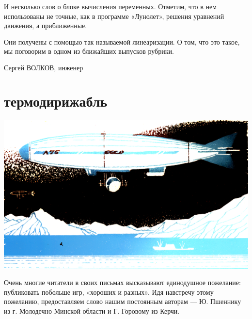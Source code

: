 \documentclass[11pt,a4paper,oneside]{article}
\begin{document}
И несколько слов о блоке вычисления переменных. Отметим, что в нем использованы не точные, как в программе «Лунолет», решения уравнений движения, а приближенные.

Они получены с помощью так называемой линеаризации. О том, что это такое, мы поговорим в одном из ближайших выпусков рубрики.

Сергей ВОЛКОВ, инженер

\section{термодирижабль}
\includegraphics[width=\textwidth]{zeppelin}

Очень многие читатели в своих письмах высказывают единодушное пожелание: публиковать побольше игр, «хороших и разных». Идя навстречу этому пожеланию, предоставляем слово нашим постоянным авторам — Ю. Пшеннику из г. Молодечно Минской области и Г. Горовому из Керчи.
\end{document}
